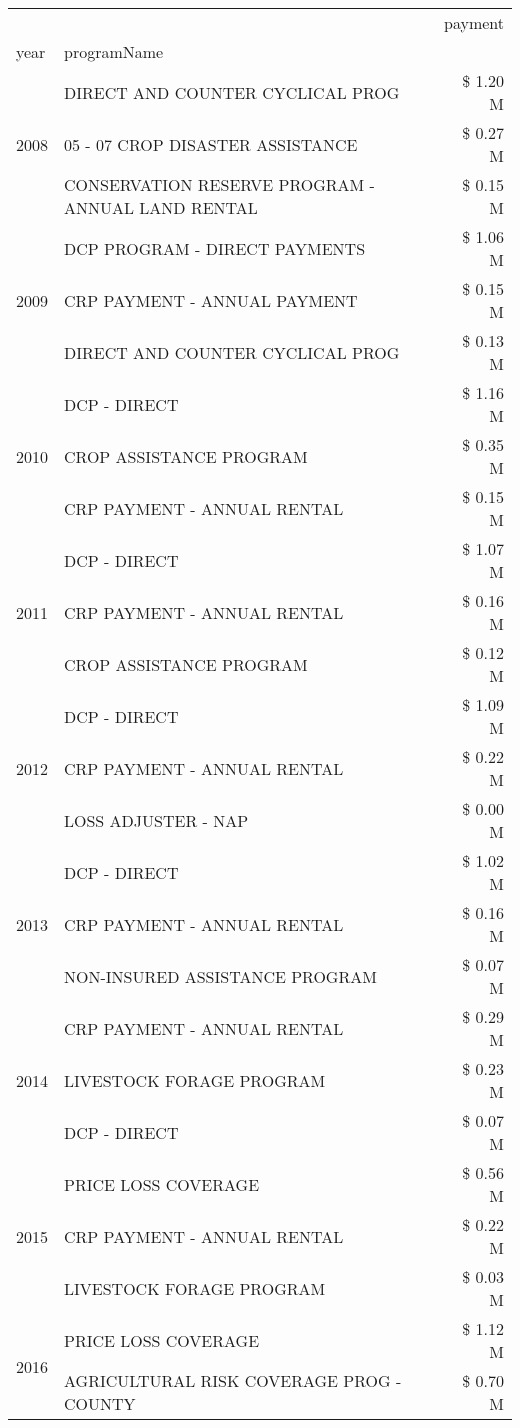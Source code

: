 \begin{tabular}{llr}
\toprule
 &  & payment \\
year & programName &  \\
\midrule
\multirow[t]{3}{*}{2008} & DIRECT AND COUNTER CYCLICAL PROG & \$ 1.20 M \\
 & 05 - 07 CROP DISASTER ASSISTANCE & \$ 0.27 M \\
 & CONSERVATION RESERVE PROGRAM - ANNUAL LAND RENTAL & \$ 0.15 M \\
\cline{1-3}
\multirow[t]{3}{*}{2009} & DCP PROGRAM - DIRECT PAYMENTS & \$ 1.06 M \\
 & CRP PAYMENT - ANNUAL PAYMENT & \$ 0.15 M \\
 & DIRECT AND COUNTER CYCLICAL PROG & \$ 0.13 M \\
\cline{1-3}
\multirow[t]{3}{*}{2010} & DCP - DIRECT & \$ 1.16 M \\
 & CROP ASSISTANCE PROGRAM & \$ 0.35 M \\
 & CRP PAYMENT - ANNUAL RENTAL & \$ 0.15 M \\
\cline{1-3}
\multirow[t]{3}{*}{2011} & DCP - DIRECT & \$ 1.07 M \\
 & CRP PAYMENT - ANNUAL RENTAL & \$ 0.16 M \\
 & CROP ASSISTANCE PROGRAM & \$ 0.12 M \\
\cline{1-3}
\multirow[t]{3}{*}{2012} & DCP - DIRECT & \$ 1.09 M \\
 & CRP PAYMENT - ANNUAL RENTAL & \$ 0.22 M \\
 & LOSS ADJUSTER - NAP & \$ 0.00 M \\
\cline{1-3}
\multirow[t]{3}{*}{2013} & DCP - DIRECT & \$ 1.02 M \\
 & CRP PAYMENT - ANNUAL RENTAL & \$ 0.16 M \\
 & NON-INSURED ASSISTANCE PROGRAM & \$ 0.07 M \\
\cline{1-3}
\multirow[t]{3}{*}{2014} & CRP PAYMENT - ANNUAL RENTAL & \$ 0.29 M \\
 & LIVESTOCK FORAGE PROGRAM & \$ 0.23 M \\
 & DCP - DIRECT & \$ 0.07 M \\
\cline{1-3}
\multirow[t]{3}{*}{2015} & PRICE LOSS COVERAGE & \$ 0.56 M \\
 & CRP PAYMENT - ANNUAL RENTAL & \$ 0.22 M \\
 & LIVESTOCK FORAGE PROGRAM & \$ 0.03 M \\
\cline{1-3}
\multirow[t]{3}{*}{2016} & PRICE LOSS COVERAGE & \$ 1.12 M \\
 & AGRICULTURAL RISK COVERAGE PROG - COUNTY & \$ 0.70 M \\

\end{tabular}
